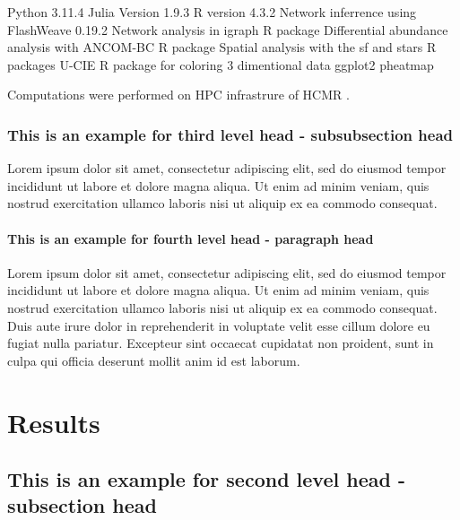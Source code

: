 \documentclass[unnumsec,webpdf,contemporary,large]{oup-authoring-template}%
\theoremstyle{thmstyleone}%
\theoremstyle{thmstyletwo}%
\theoremstyle{thmstylethree}%
\begin{document}
Python 3.11.4
Julia Version 1.9.3 \citep{Julia-2017}
R version 4.3.2 \citep{rcoreteam}
Network inferrence using FlashWeave 0.19.2 \citep{Tackmann2019}
Network analysis in igraph R package \citep{Csardi2006}
Differential abundance analysis with ANCOM-BC R package \citep{Lin2020,Lin2023}
Spatial analysis with the sf and stars R packages \citep{Pebesma2023}
U-CIE R package for coloring 3 dimentional data \citep{Koutrouli2022}
ggplot2 \citep{ggplot22016}
pheatmap \citep{Kolde2019}

Computations were performed on HPC infrastrure of HCMR \citep{Zafeiropoulos2021}.

\subsubsection{This is an example for third level head - subsubsection head}\label{subsubsec1}

Lorem ipsum dolor sit amet, consectetur adipiscing elit, sed do
eiusmod tempor incididunt ut labore et dolore magna aliqua. Ut enim ad minim veniam, quis nostrud exercitation ullamco laboris nisi ut aliquip ex ea commodo consequat. %

\paragraph{This is an example for fourth level head - paragraph head}

Lorem ipsum dolor sit amet, consectetur adipiscing elit, sed do eiusmod tempor incididunt ut labore et dolore magna aliqua. Ut enim ad minim veniam, quis nostrud exercitation ullamco laboris nisi ut aliquip ex ea commodo consequat. Duis aute irure dolor in reprehenderit in voluptate velit esse cillum dolore eu fugiat nulla pariatur. Excepteur sint occaecat cupidatat non proident, sunt in culpa qui officia deserunt mollit anim id est laborum.

\section{Results}\label{results}

\subsection{This is an example for second level head - subsection head}\label{subsec2}
\end{document}
